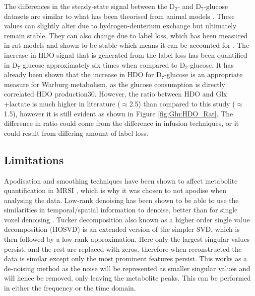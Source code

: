\documentclass[class=article, crop=false]{standalone}
\begin{document}
The differences in the steady-state signal between the D$_2$- and D$_7$-glucose datasets are similar to what has been theorised from animal models \cite{Mahar2021DeuteratedGlucose}. These values can slightly alter due to hydrogen-deuterium exchange but ultimately remain stable. They can also change due to label loss, which has been measured in rat models and shown to be stable which means it can be accounted for \cite{DeGraaf2021CharacterizationStudies}. The increase in HDO signal that is generated from the label loss has been quantified in D$_7$-glucose approximately six times when compared to D$_2$-glucose. It has already been shown that the increase in HDO for D$_7$-glucose is an appropriate measure for Warburg metabolism, as the glucose consumption is directly correlated HDO production30. However, the ratio between HDO and Glx +lactate is much higher in literature ($\approx$2.5) than compared to this study ($\approx$1.5), however it is still evident as shown in Figure \ref{fig:Glu:HDO_Rat}. The difference in ratio could come from the difference in infusion techniques, or it could result from differing amount of label loss.

\subsection{Limitations}

Apodisation and smoothing techniques have been shown to affect metabolite quantification in MRSI \cite{Goryawala2020EffectsFitting}, which is why it was chosen to not apodise when analysing the data. Low-rank denoising has been shown to be able to use the similarities in temporal/spatial information to denoise, better than for single voxel denoising \cite{Brender2019DynamicHyperpolarization, Goryawala2020EffectsFitting}. Tucker decomposition also known as a higher order single value decomposition (HOSVD) is an extended version of the simpler SVD, which is then followed by a low rank approximation. Here only the largest singular values persist, and the rest are replaced with zeros, therefore when reconstructed the data is similar except only the most prominent features persist. This works as a de-noising method as the noise will be represented as smaller singular values and will hence be removed, only leaving the metabolite peaks. This can be performed in either the frequency or the time domain. 
\end{document}
